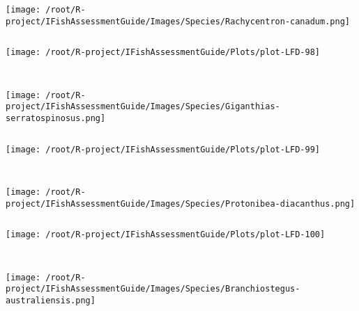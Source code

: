 \documentclass{report}\usepackage[]{graphicx}\usepackage[]{color}
\makeatletter
\def\maxwidth{ %
  \ifdim\Gin@nat@width>\linewidth
    \linewidth
  \else
    \Gin@nat@width
  \fi
}
\newenvironment{kframe}{%
 \def\at@end@of@kframe{}%
 \ifinner\ifhmode%
  \def\at@end@of@kframe{\end{minipage}}%
  \begin{minipage}{\columnwidth}%
 \fi\fi%
 \def\FrameCommand##1{\hskip\@totalleftmargin \hskip-\fboxsep
 \colorbox{shadecolor}{##1}\hskip-\fboxsep
     \hskip-\linewidth \hskip-\@totalleftmargin \hskip\columnwidth}%
 \MakeFramed {\advance\hsize-\width
   \@totalleftmargin\z@ \linewidth\hsize
   \@setminipage}}%
 {\par\unskip\endMakeFramed%
 \at@end@of@kframe}
\newenvironment{knitrout}{}{} %
\makeatother
\begin{document}
\begin{knitrout}
\begin{kframe}
\begin{verbatim}
\end{verbatim}
\end{kframe}
\texttt{[image: /root/R-project/IFishAssessmentGuide/Images/Species/Rachycentron-canadum.png]}
\begin{kframe}\begin{verbatim}
\end{verbatim}
\end{kframe}
\texttt{[image: /root/R-project/IFishAssessmentGuide/Plots/plot-LFD-98]} 
\begin{kframe}\begin{verbatim}
 
\end{verbatim}
\end{kframe}
\texttt{[image: /root/R-project/IFishAssessmentGuide/Images/Species/Giganthias-serratospinosus.png]}
\begin{kframe}\begin{verbatim}
\end{verbatim}
\end{kframe}
\texttt{[image: /root/R-project/IFishAssessmentGuide/Plots/plot-LFD-99]} 
\begin{kframe}\begin{verbatim}
 
\end{verbatim}
\end{kframe}
\texttt{[image: /root/R-project/IFishAssessmentGuide/Images/Species/Protonibea-diacanthus.png]}
\begin{kframe}\begin{verbatim}
\end{verbatim}
\end{kframe}
\texttt{[image: /root/R-project/IFishAssessmentGuide/Plots/plot-LFD-100]} 
\begin{kframe}\begin{verbatim}
 
\end{verbatim}
\end{kframe}
\texttt{[image: /root/R-project/IFishAssessmentGuide/Images/Species/Branchiostegus-australiensis.png]}
\begin{kframe}\begin{verbatim}
\end{verbatim}
\end{kframe}
\end{knitrout}
\end{document}
